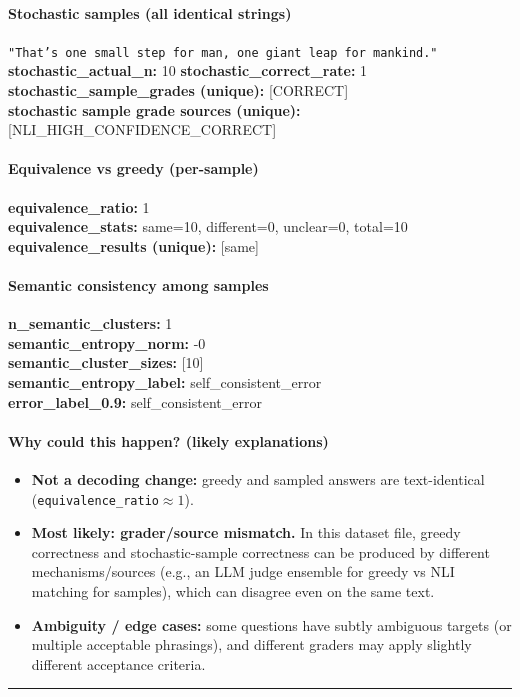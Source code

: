 \documentclass[11pt]{article}
\newcommand{\mono}[1]{\texttt{#1}}
\begin{document}
\paragraph{Stochastic samples (all identical strings)}
\mono{"That's one small step for man, one giant leap for mankind."}\\
\textbf{stochastic\_actual\_n:} 10 \quad \textbf{stochastic\_correct\_rate:} 1\\
\textbf{stochastic\_sample\_grades (unique):} [CORRECT]\\
\textbf{stochastic sample grade sources (unique):} [NLI\_HIGH\_CONFIDENCE\_CORRECT]\\
\paragraph{Equivalence vs greedy (per-sample)}
\textbf{equivalence\_ratio:} 1\\
\textbf{equivalence\_stats:} same=10, different=0, unclear=0, total=10\\
\textbf{equivalence\_results (unique):} [same]\\
\paragraph{Semantic consistency among samples}
\textbf{n\_semantic\_clusters:} 1\\
\textbf{semantic\_entropy\_norm:} -0\\
\textbf{semantic\_cluster\_sizes:} [10]\\
\textbf{semantic\_entropy\_label:} self\_consistent\_error\\
\textbf{error\_label\_0.9:} self\_consistent\_error\\
\paragraph{Why could this happen? (likely explanations)}
\begin{itemize}\item \textbf{Not a decoding change:} greedy and sampled answers are text-identical (\mono{equivalence\_ratio}$\approx 1$).\item \textbf{Most likely: grader/source mismatch.} In this dataset file, greedy correctness and stochastic-sample correctness can be produced by different mechanisms/sources (e.g., an LLM judge ensemble for greedy vs NLI matching for samples), which can disagree even on the same text.\item \textbf{Ambiguity / edge cases:} some questions have subtly ambiguous targets (or multiple acceptable phrasings), and different graders may apply slightly different acceptance criteria.\end{itemize}
\vspace{10pt}
\hrule
\vspace{10pt}
\end{document}
